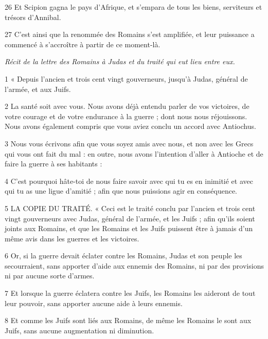\par 26 Et Scipion gagna le pays d'Afrique, et s'empara de tous les biens, serviteurs et trésors d'Annibal.

\par 27 C'est ainsi que la renommée des Romains s'est amplifiée, et leur puissance a commencé à s'accroître à partir de ce moment-là.


\par \textit{Récit de la lettre des Romains à Judas et du traité qui eut lieu entre eux.}

\par 1 « Depuis l'ancien et trois cent vingt gouverneurs, jusqu'à Judas, général de l'armée, et aux Juifs.

\par 2 La santé soit avec vous. Nous avons déjà entendu parler de vos victoires, de votre courage et de votre endurance à la guerre ; dont nous nous réjouissons. Nous avons également compris que vous aviez conclu un accord avec Antiochus.

\par 3 Nous vous écrivons afin que vous soyez amis avec nous, et non avec les Grecs qui vous ont fait du mal : en outre, nous avons l'intention d'aller à Antioche et de faire la guerre à ses habitants :

\par 4 C'est pourquoi hâte-toi de nous faire savoir avec qui tu es en inimitié et avec qui tu as une ligue d'amitié ; afin que nous puissions agir en conséquence.

\par 5 LA COPIE DU TRAITÉ. « Ceci est le traité conclu par l'ancien et trois cent vingt gouverneurs avec Judas, général de l'armée, et les Juifs ; afin qu'ils soient joints aux Romains, et que les Romains et les Juifs puissent être à jamais d'un même avis dans les guerres et les victoires.

\par 6 Or, si la guerre devait éclater contre les Romains, Judas et son peuple les secourraient, sans apporter d'aide aux ennemis des Romains, ni par des provisions ni par aucune sorte d'armes.

\par 7 Et lorsque la guerre éclatera contre les Juifs, les Romains les aideront de tout leur pouvoir, sans apporter aucune aide à leurs ennemis.

\par 8 Et comme les Juifs sont liés aux Romains, de même les Romains le sont aux Juifs, sans aucune augmentation ni diminution.

